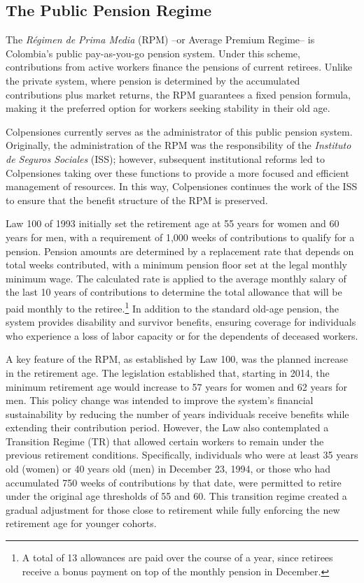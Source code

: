 \documentclass[12pt, a4paper]{article}
\begin{document}
\subsection{The Public Pension Regime}
The \textit{Régimen de Prima Media} (RPM) --or Average Premium Regime-- is Colombia's public pay-as-you-go pension system. Under this scheme, contributions from active workers finance the pensions of current retirees. Unlike the private system, where pension is determined by the accumulated contributions plus market returns, the RPM guarantees a fixed pension formula, making it the preferred option for workers seeking stability in their old age.

Colpensiones currently serves as the administrator of this public pension system. Originally, the administration of the RPM was the responsibility of the \textit{Instituto de Seguros Sociales} (ISS); however, subsequent institutional reforms led to Colpensiones taking over these functions to provide a more focused and efficient management of resources. In this way, Colpensiones continues the work of the ISS to ensure that the benefit structure of the RPM is preserved.

Law 100 of 1993 initially set the retirement age at 55 years for women and 60 years for men, with a requirement of 1,000 weeks of contributions to qualify for a pension. Pension amounts are determined by a replacement rate that depends on total weeks contributed, with a minimum pension floor set at the legal monthly minimum wage. The calculated rate is applied to the average monthly salary of the last 10 years of contributions to determine the total allowance that will be paid monthly to the retiree.\footnote{A total of 13 allowances are paid over the course of a year, since retirees receive a bonus payment on top of the monthly pension in December.} In addition to the standard old-age pension, the system provides disability and survivor benefits, ensuring coverage for individuals who experience a loss of labor capacity or for the dependents of deceased workers.

A key feature of the RPM, as established by Law 100, was the planned increase in the retirement age. The legislation established that, starting in 2014, the minimum retirement age would increase to 57 years for women and 62 years for men. This policy change was intended to improve the system’s financial sustainability by reducing the number of years individuals receive benefits while extending their contribution period. However, the Law also contemplated a Transition Regime (TR) that allowed certain workers to remain under the previous retirement conditions. Specifically, individuals who were at least 35 years old (women) or 40 years old (men) in December 23, 1994, or those who had accumulated 750 weeks of contributions by that date, were permitted to retire under the original age thresholds of 55 and 60. This transition regime created a gradual adjustment for those close to retirement while fully enforcing the new retirement age for younger cohorts.
\end{document}
